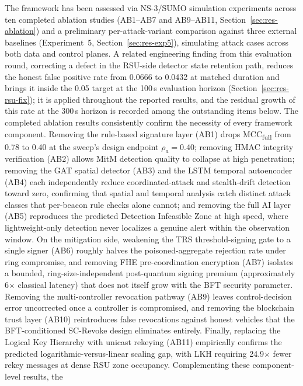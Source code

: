 \documentclass[12pt, a4paper]{report}
\begin{document}
The framework has been assessed via NS-3/SUMO simulation experiments
across ten completed ablation studies (AB1--AB7 and AB9--AB11,
Section~\ref{sec:res-ablation}) and a preliminary per-attack-variant
comparison against three external baselines (Experiment~5,
Section~\ref{sec:res-exp5}), simulating attack cases across both data
and control planes. A related engineering finding from this evaluation
round, correcting a defect in the RSU-side detector state retention
path, reduces the honest false positive rate from 0.0666 to 0.0432 at
matched duration and brings it inside the 0.05 target at the 100\,s
evaluation horizon (Section~\ref{sec:res-rsu-fix}); it is applied
throughout the reported results, and the residual growth of this rate
at the 300\,s horizon is recorded among the outstanding items below.
The completed ablation results
consistently confirm the necessity of every framework component. Removing
the rule-based signature layer (AB1) drops MCC\textsubscript{full} from
0.78 to 0.40 at the sweep's design endpoint $\rho_a = 0.40$;
removing HMAC integrity verification (AB2) allows
MitM detection quality to collapse at high penetration; removing the GAT
spatial detector (AB3) and the LSTM temporal autoencoder (AB4) each
independently reduce coordinated-attack and stealth-drift detection
toward zero, confirming that spatial and temporal analysis catch
distinct attack classes that per-beacon rule checks alone cannot; and
removing the full AI layer (AB5) reproduces the predicted Detection
Infeasible Zone at high speed, where lightweight-only detection never
localizes a genuine alert within the observation window. On the
mitigation side, weakening the TRS threshold-signing gate to a
single signer (AB6) roughly halves the poisoned-aggregate rejection
rate under ring compromise, and removing FHE pre-coordination
encryption (AB7) isolates a bounded, ring-size-independent post-quantum
signing premium (approximately 6$\times$ classical latency) that does
not itself grow with the BFT security parameter. Removing the
multi-controller revocation pathway (AB9) leaves control-decision
error uncorrected once a controller is compromised, and removing the
blockchain trust layer (AB10) reintroduces false revocations against
honest vehicles that the BFT-conditioned SC-Revoke design eliminates
entirely. Finally, replacing the Logical Key Hierarchy with unicast
rekeying (AB11) empirically confirms the predicted logarithmic-versus-linear
scaling gap, with LKH requiring 24.9$\times$ fewer rekey messages at dense
RSU zone occupancy. Complementing these component-level results, the
\end{document}
